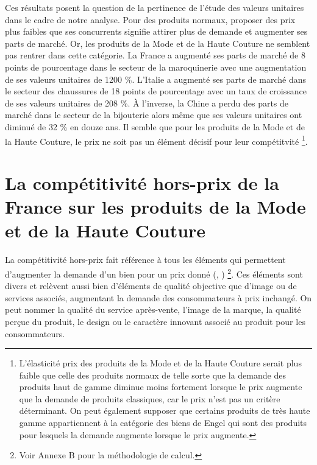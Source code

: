 \documentclass[french,10pt,a4paper]{article}
\begin{document}
Ces résultats posent la question de la pertinence de l'étude des valeurs unitaires dans le cadre de notre analyse. Pour des produits \og normaux\fg{}, proposer des prix plus faibles que ses concurrents signifie attirer plus de demande et augmenter ses parts de marché. Or, les produits de la Mode et de la Haute Couture ne semblent pas rentrer dans cette catégorie. La France a augmenté ses parts de marché de 8 points de pourcentage dans le secteur de la maroquinerie avec une augmentation de ses valeurs unitaires de 1200 \%. L'Italie a augmenté ses parts de marché dans le secteur des chaussures de 18 points de pourcentage avec un taux de croissance de ses valeurs unitaires de 208 \%. À l'inverse, la Chine a perdu des parts de marché dans le secteur de la bijouterie alors même que ses valeurs unitaires ont diminué de 32 \% en douze ans. Il semble que pour les produits de la Mode et de la Haute Couture, le prix ne soit pas un élément décisif pour leur compétitvité \footnote{L'élasticité prix des produits de la Mode et de la Haute Couture serait plus faible que celle des produits \og normaux\fg{} de telle sorte que la demande des produits haut de gamme diminue moins fortement lorsque le prix augmente que la demande de produits classiques, car le prix n'est pas un critère déterminant. On peut également supposer que certains produits de très haute gamme appartiennent à la catégorie des biens de \og Engel\fg{} qui sont des produits pour lesquels la demande augmente lorsque le prix augmente.}.



\newpage
{}
\section{La compétitivité hors-prix de la France sur les produits de la Mode et de la Haute Couture}

La compétitivité hors-prix fait référence à tous les éléments qui permettent d'augmenter la demande d'un bien pour un prix donné (\cite{Khandelwal2013}, \cite{Bas2015}) \footnote{Voir Annexe B pour la méthodologie de calcul.}. Ces éléments sont divers et relèvent aussi bien d'éléments de qualité objective que d'image ou de services associés, augmentant la demande des consommateurs à prix inchangé. On peut nommer la qualité du service après-vente, l'image de la marque, la qualité perçue du produit, le design ou le caractère innovant associé au produit pour les consommateurs.
\end{document}
